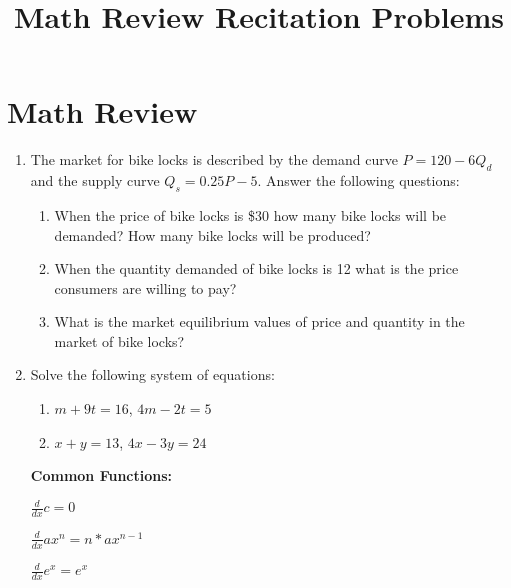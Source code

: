 \documentclass[11pt]{article}
\title{Math Review Recitation Problems}
\begin{document}
  
\section*{Math Review}

\begin{enumerate}
  \item The market for bike locks is described by the demand curve $P = 120 - 6Q_d$ and the supply curve $Q_s = 0.25P - 5$. Answer the following questions:

    \begin{enumerate}
      \item When the price of bike locks is \$30 how many bike locks will be demanded? How many bike locks will be produced?

      \item When the quantity demanded of bike locks is 12 what is the price consumers are willing to pay?

      \item What is the market equilibrium values of price and quantity in the market of bike locks?
    \end{enumerate}



  \vspace*{70mm} 
  \item Solve the following system of equations:
  
  \begin{multicols}{2}
    \begin{enumerate}
      \item $m + 9t = 16$, $4m - 2t = 5$
      
      \item $x + y = 13$, $4x - 3y = 24$
    \end{enumerate}
  \end{multicols}


  \newpage
  \begin{tcolorbox}[title= {\bf Helpful Derivative Formulae:}]
    \begin{multicols}{2}
        {\bf Common Functions:}

        \vspace{5mm}  
        $\frac{d}{dx} c = 0$
        
        \vspace{5mm}  
        $\frac{d}{dx} ax^n = n*a x^{n-1}$

        \vspace{5mm}  
        $\frac{d}{dx} e^x = e^x$


\end{multicols}
\end{tcolorbox}
\end{enumerate}
\end{document}
